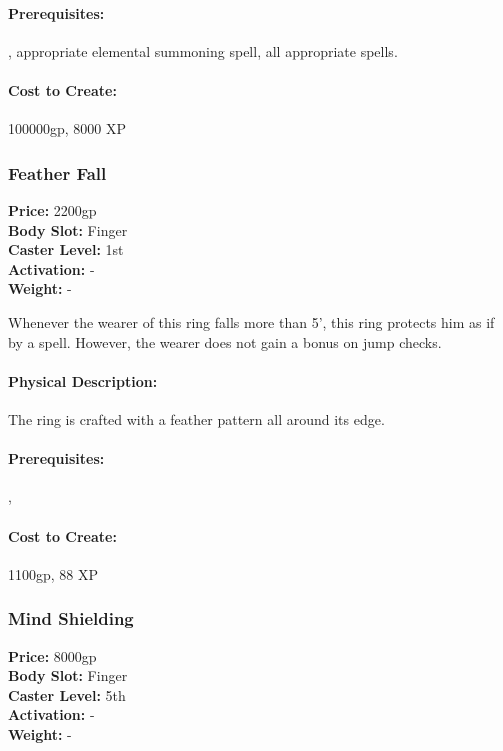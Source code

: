 \paragraph{Prerequisites:} , appropriate elemental summoning spell, all appropriate spells.

\paragraph{Cost to Create:} 100000gp, 8000 XP
\subsubsection{Feather Fall}
\label{Item:FeatherFall}
   \textbf{Price:} 2200gp
\\ \textbf{Body Slot:} Finger
\\ \textbf{Caster Level:} 1st
\\ \textbf{Activation:} -
\\ \textbf{Weight:} -

Whenever the wearer of this ring falls more than 5', this ring protects him as if by a  spell. However, the wearer does not gain a bonus on jump checks.

\paragraph{Physical Description:} The ring is crafted with a feather pattern all around its edge.

\paragraph{Prerequisites:} , 

\paragraph{Cost to Create:} 1100gp, 88 XP
\subsubsection{Mind Shielding}
\label{Item:MindShielding}
   \textbf{Price:} 8000gp
\\ \textbf{Body Slot:} Finger
\\ \textbf{Caster Level:} 5th
\\ \textbf{Activation:} -
\\ \textbf{Weight:} -

